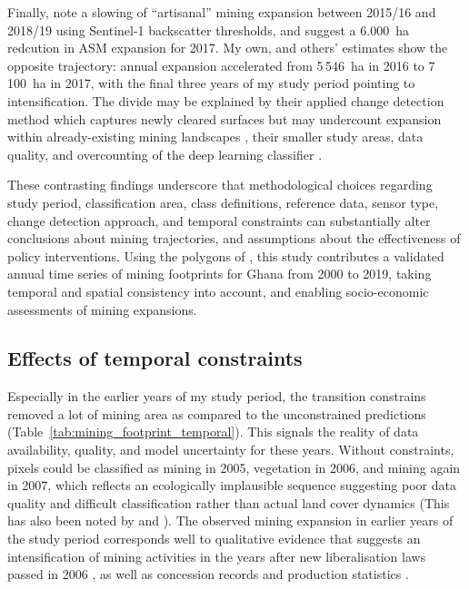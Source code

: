 \documentclass[]{interact}
\begin{document}
Finally, \citet{forkuor2020Mapping} note a slowing of ``artisanal'' mining expansion between 2015/16 and 2018/19 using Sentinel-1 backscatter thresholds, and \citet{gallwey2020Sentinel2} suggest a 6.000~ha redcution in ASM expansion for 2017. My own, and others' estimates \citep{snapir2017Mapping,barenblitt2021large,obodai2019Land} show the opposite trajectory: annual expansion accelerated from 5\,546~ha in 2016 to 7\,100~ha in 2017, with the final three years of my study period pointing to intensification. The divide may be explained by their applied change detection method which captures newly cleared surfaces but may undercount expansion within already-existing mining landscapes \citep{forkuor2020Mapping}, their smaller study areas, data quality, and overcounting of the deep learning classifier \citep{gallwey2020Sentinel2}.

These contrasting findings underscore that methodological choices regarding study period, classification area, class definitions, reference data, sensor type, change detection approach, and temporal constraints can substantially alter conclusions about mining trajectories, and assumptions about the effectiveness of policy interventions. Using the polygons of \citet{maus2022update}, this study contributes a validated annual time series of mining footprints for Ghana from 2000 to 2019, taking temporal and spatial consistency into account, and enabling socio-economic assessments of mining expansions.

\subsection{Effects of temporal constraints}
Especially in the earlier years of my study period, the transition constrains removed a lot of mining area as compared to the unconstrained predictions (Table~\ref{tab:mining_footprint_temporal}). This signals the reality of data availability, quality, and model uncertainty for these years. Without constraints, pixels could be classified as mining in 2005, vegetation in 2006, and mining again in 2007, which reflects an ecologically implausible sequence suggesting poor data quality and difficult classification rather than actual land cover dynamics (This has also been noted by \citet[p. 9]{barenblitt2021large} and \citet[p. 2]{forkuor2020Mapping}). The observed mining expansion in earlier years of the study period corresponds well to qualitative evidence that suggests an intensification of mining activities in the years after new liberalisation laws passed in 2006 \citep{asiedu2023Assessing,asori2022illegal,andrews2018Land}, as well as concession records and production statistics \citep{Industrystatistics}. 
\end{document}
